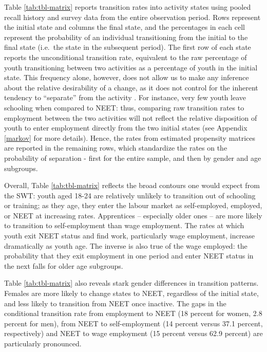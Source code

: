 \documentclass[
  a4paper, twoside, 12pt]{book}
\begin{document}
Table \ref{tab:tbl-matrix} reports transition rates into activity states using pooled recall history and survey data from the entire observation period. Rows represent the initial state and columns the final state, and the percentages in each cell represent the probability of an individual transitioning from the initial to the final state (i.e.~the state in the subsequent period). The first row of each state reports the unconditional transition rate, equivalent to the raw percentage of youth transitioning between two activities as a percentage of youth in the initial state. This frequency alone, however, does not allow us to make any inference about the relative desirability of a change, as it does not control for the inherent tendency to ``separate'' from the activity \autocite{bosch2010}. For instance, very few youth leave schooling when compared to NEET: thus, comparing raw transition rates to employment between the two activities will not reflect the relative disposition of youth to enter employment directly from the two initial states (see Appendix \ref{markov} for more details). Hence, the rates from estimated propensity matrices are reported in the remaining rows, which standardize the rates on the probability of separation - first for the entire sample, and then by gender and age subgroups.

Overall, Table \ref{tab:tbl-matrix} reflects the broad contours one would expect from the SWT: youth aged 18-24 are relatively unlikely to transition out of schooling or training; as they age, they enter the labour market as self-employed, employed, or NEET at increasing rates. Apprentices -- especially older ones -- are more likely to transition to self-employment than wage employment. The rates at which youth exit NEET status and find work, particularly wage employment, increase dramatically as youth age. The inverse is also true of the wage employed: the probability that they exit employment in one period and enter NEET status in the next falls for older age subgroups.

Table \ref{tab:tbl-matrix} also reveals stark gender differences in transition patterns. Females are more likely to change states to NEET, regardless of the initial state, and less likely to transition from NEET once inactive. The gaps in the conditional transition rate from employment to NEET (18 percent for women, 2.8 percent for men), from NEET to self-employment (14 percent versus 37.1 percent, respectively) and NEET to wage employment (15 percent versus 62.9 percent) are particularly pronounced.
\end{document}
